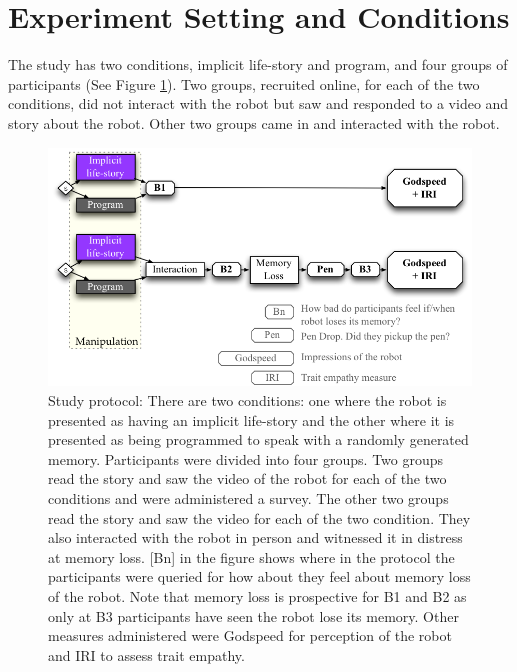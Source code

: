 \section{Experiment Setting and Conditions}
The study has two conditions, implicit life-story and program, and four groups of participants (See Figure \ref{fig_study_protocol}). Two groups, recruited online, for each of the two conditions, did not interact with the robot but saw and responded to a video and story about the robot. Other two groups came in and interacted with the robot. 

   \begin{figure}[thpb]
      \centering
      \includegraphics[width=4.6in]{figures/study/study_protocol_implicit.png}
      \caption{Study protocol: There are two conditions: one where the robot is presented as having an implicit life-story and the other where it is presented as being programmed to speak with a randomly generated memory. Participants were divided into four groups. Two groups read the story and saw the video of the robot for each of the two conditions and were administered a survey. The other two groups read the story and saw the video for each of the two condition. They also interacted with the robot in person and witnessed it in distress at memory loss. [Bn] in the figure shows where in the protocol the participants were queried for how about they feel about memory loss of the robot. Note that memory loss is prospective for B1 and B2 as only at B3 participants have seen the robot lose its memory. Other measures administered were Godspeed for perception of the robot and IRI to assess trait empathy.}
      \label{fig_study_protocol}
   \end{figure}

